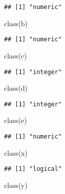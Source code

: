 \documentclass[
]{article}
\newenvironment{Shaded}{\begin{snugshade}}{\end{snugshade}}
\newcommand{\FunctionTok}[1]{\textcolor[rgb]{0.00,0.00,0.00}{#1}}
\newcommand{\NormalTok}[1]{#1}
\begin{document}
\begin{verbatim}
## [1] "numeric"
\end{verbatim}

\begin{Shaded}
\begin{Highlighting}[]
\FunctionTok{class}\NormalTok{(b)}
\end{Highlighting}
\end{Shaded}

\begin{verbatim}
## [1] "numeric"
\end{verbatim}

\begin{Shaded}
\begin{Highlighting}[]
\FunctionTok{class}\NormalTok{(c)}
\end{Highlighting}
\end{Shaded}

\begin{verbatim}
## [1] "integer"
\end{verbatim}

\begin{Shaded}
\begin{Highlighting}[]
\FunctionTok{class}\NormalTok{(d)}
\end{Highlighting}
\end{Shaded}

\begin{verbatim}
## [1] "integer"
\end{verbatim}

\begin{Shaded}
\begin{Highlighting}[]
\FunctionTok{class}\NormalTok{(e)}
\end{Highlighting}
\end{Shaded}

\begin{verbatim}
## [1] "numeric"
\end{verbatim}

\begin{Shaded}
\begin{Highlighting}[]
\FunctionTok{class}\NormalTok{(x)}
\end{Highlighting}
\end{Shaded}

\begin{verbatim}
## [1] "logical"
\end{verbatim}

\begin{Shaded}
\begin{Highlighting}[]
\FunctionTok{class}\NormalTok{(y)}
\end{Highlighting}
\end{Shaded}
\end{document}
